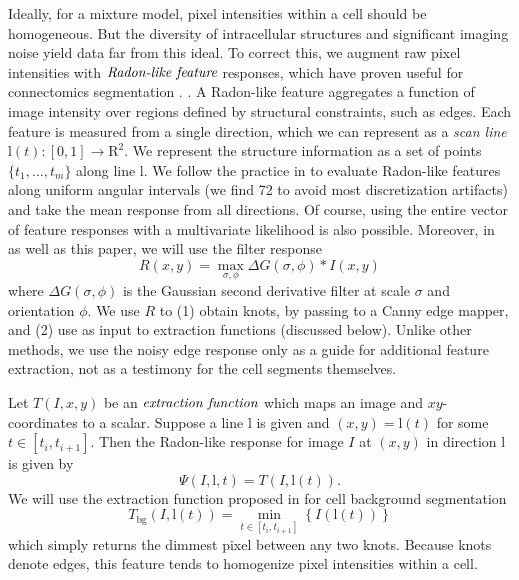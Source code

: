 \documentclass[english]{article}
\newcommand{\+}[1]{\ensuremath{\boldsymbol{\mathrm{#1}}}}
\begin{document}
Ideally, for a mixture model, pixel intensities within a cell should be homogeneous. But the diversity of intracellular structures and significant imaging noise yield data far from this ideal. To correct this, we augment raw pixel intensities with $\emph{Radon-like feature}$ responses, which have proven useful for connectomics segmentation \cite{Kumar2010}. . A Radon-like feature aggregates a function of image intensity over regions defined by structural constraints, such as edges. Each feature is measured from a single direction, which we can represent as a \emph{scan line} $\+{l}(t) : [0, 1] \rightarrow \+{R}^2$. We represent the structure information as a set of points $\{ t_1, \ldots, t_m \}$ along line $\+{l}$. We follow the practice in \cite{Kumar2010} to evaluate Radon-like features along uniform angular intervals (we find 72 to avoid most discretization artifacts) and take the mean response from all directions. Of course, using the entire vector of feature responses with a multivariate likelihood is also possible. Moreover, in \cite{Kumar2010} as well as this paper, we will use the filter response $$R(x,y) = \max_{\sigma, \phi} \Delta G(\sigma, \phi) \ast I(x,y) $$ where $\Delta G(\sigma, \phi)$ is the Gaussian second derivative filter at scale $\sigma$ and orientation $\phi$. We use $R$ to (1) obtain knots, by passing to a Canny edge mapper, and (2) use as input to extraction functions (discussed below). Unlike other methods, we use the noisy edge response only as a guide for additional feature extraction, not as a testimony for the cell segments themselves.

Let $T(I, x, y)$ be an $\emph{extraction function}$ which maps an image and $xy$-coordinates to a scalar. Suppose a line $\+{l}$ is given and $(x, y) = \+{l}(t)$ for some $t \in [t_i, t_{i+1}]$. Then the Radon-like response for image $I$ at $(x, y)$ in direction $\+{l}$ is given by $$\Psi \left( I,\+{l},t \right) = T \left( I, \+{l}(t) \right).$$ We will use the extraction function proposed in \cite{Kumar2010} for cell background segmentation $$T_{\text{bg}}(I, \+{l}(t)) = \min_{t \in [t_i, t_{i+1}]} \left\{ I \left( \+{l}(t) \right) \right\}$$ which simply returns the dimmest pixel between any two knots. Because knots denote edges, this feature tends to homogenize pixel intensities within a cell.
\end{document}

